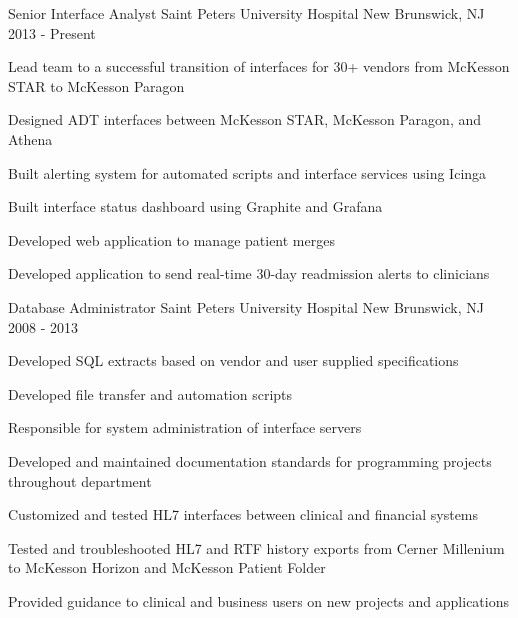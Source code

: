 

\begin{cventries}

  \cventry
  {Senior Interface Analyst} %
  {Saint Peters University Hospital} %
  {New Brunswick, NJ} %
  {2013 - Present} %
  {
    \begin{cvitems} %
      \item {Lead team to a successful transition of interfaces for 30+ vendors from McKesson STAR to McKesson Paragon}
      \item {Designed ADT interfaces between McKesson STAR, McKesson Paragon, and Athena}
      \item {Built alerting system for automated scripts and interface services using Icinga}
      \item {Built interface status dashboard using Graphite and Grafana}
      \item {Developed web application to manage patient merges}
      \item {Developed application to send real-time 30-day readmission alerts to clinicians}
    \end{cvitems}
  }

  \cventry
  {Database Administrator} %
  {Saint Peters University Hospital} %
  {New Brunswick, NJ} %
  {2008 - 2013} %
  {
    \begin{cvitems} %
      \item {Developed SQL extracts based on vendor and user supplied specifications}
      \item {Developed file transfer and automation scripts}
      \item {Responsible for system administration of interface servers}
      \item {Developed and maintained documentation standards for programming projects throughout department}
      \item {Customized and tested HL7 interfaces between clinical and financial systems}
      \item {Tested and troubleshooted HL7 and RTF history exports from Cerner Millenium to McKesson Horizon and McKesson Patient Folder}
      \item {Provided guidance to clinical and business users on new projects and applications}
    \end{cvitems}
  }


\end{cventries}
